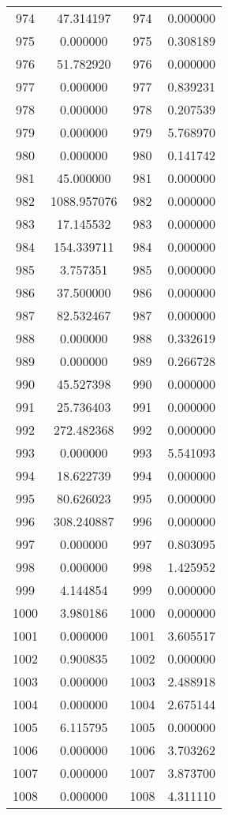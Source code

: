 \documentclass[12pt]{article}
\begin{document}
\begin{longtable}{@{}cccc@{}}
974 & 47.314197 & 974 & 0.000000 \\
975 & 0.000000 & 975 & 0.308189 \\
976 & 51.782920 & 976 & 0.000000 \\
977 & 0.000000 & 977 & 0.839231 \\
978 & 0.000000 & 978 & 0.207539 \\
979 & 0.000000 & 979 & 5.768970 \\
980 & 0.000000 & 980 & 0.141742 \\
981 & 45.000000 & 981 & 0.000000 \\
982 & 1088.957076 & 982 & 0.000000 \\
983 & 17.145532 & 983 & 0.000000 \\
984 & 154.339711 & 984 & 0.000000 \\
985 & 3.757351 & 985 & 0.000000 \\
986 & 37.500000 & 986 & 0.000000 \\
987 & 82.532467 & 987 & 0.000000 \\
988 & 0.000000 & 988 & 0.332619 \\
989 & 0.000000 & 989 & 0.266728 \\
990 & 45.527398 & 990 & 0.000000 \\
991 & 25.736403 & 991 & 0.000000 \\
992 & 272.482368 & 992 & 0.000000 \\
993 & 0.000000 & 993 & 5.541093 \\
994 & 18.622739 & 994 & 0.000000 \\
995 & 80.626023 & 995 & 0.000000 \\
996 & 308.240887 & 996 & 0.000000 \\
997 & 0.000000 & 997 & 0.803095 \\
998 & 0.000000 & 998 & 1.425952 \\
999 & 4.144854 & 999 & 0.000000 \\
1000 & 3.980186 & 1000 & 0.000000 \\
1001 & 0.000000 & 1001 & 3.605517 \\
1002 & 0.900835 & 1002 & 0.000000 \\
1003 & 0.000000 & 1003 & 2.488918 \\
1004 & 0.000000 & 1004 & 2.675144 \\
1005 & 6.115795 & 1005 & 0.000000 \\
1006 & 0.000000 & 1006 & 3.703262 \\
1007 & 0.000000 & 1007 & 3.873700 \\
1008 & 0.000000 & 1008 & 4.311110 \\

\end{longtable}
\end{document}
